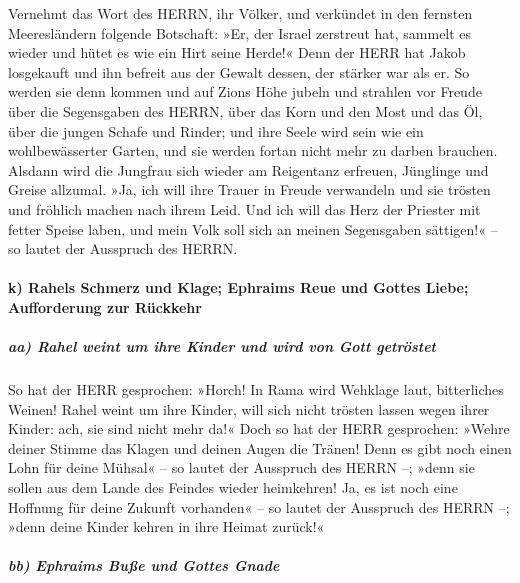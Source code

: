 Vernehmt das Wort des HERRN, ihr Völker, und verkündet in
den fernsten Meeresländern folgende Botschaft: »Er, der Israel zerstreut
hat, sammelt es wieder und hütet es wie ein Hirt seine Herde!«
Denn der HERR hat Jakob losgekauft und ihn befreit aus
der Gewalt dessen, der stärker war als er. So werden sie
denn kommen und auf Zions Höhe jubeln und strahlen vor Freude über die
Segensgaben des HERRN, über das Korn und den Most und das Öl, über die
jungen Schafe und Rinder; und ihre Seele wird sein wie ein
wohlbewässerter Garten, und sie werden fortan nicht mehr zu darben
brauchen. Alsdann wird die Jungfrau sich wieder am
Reigentanz erfreuen, Jünglinge und Greise allzumal. »Ja, ich will ihre
Trauer in Freude verwandeln und sie trösten und fröhlich machen nach
ihrem Leid. Und ich will das Herz der Priester mit fetter
Speise laben, und mein Volk soll sich an meinen Segensgaben sättigen!«
-- so lautet der Ausspruch des HERRN.

\hypertarget{k-rahels-schmerz-und-klage-ephraims-reue-und-gottes-liebe-aufforderung-zur-ruxfcckkehr}{%
\paragraph{k) Rahels Schmerz und Klage; Ephraims Reue und Gottes Liebe;
Aufforderung zur
Rückkehr}\label{k-rahels-schmerz-und-klage-ephraims-reue-und-gottes-liebe-aufforderung-zur-ruxfcckkehr}}

\hypertarget{aa-rahel-weint-um-ihre-kinder-und-wird-von-gott-getruxf6stet}{%
\subparagraph{aa) Rahel weint um ihre Kinder und wird von Gott
getröstet}\label{aa-rahel-weint-um-ihre-kinder-und-wird-von-gott-getruxf6stet}}

So hat der HERR gesprochen: »Horch! In Rama wird Wehklage
laut, bitterliches Weinen! Rahel weint um ihre Kinder, will sich nicht
trösten lassen wegen ihrer Kinder: ach, sie sind nicht mehr da!«
Doch so hat der HERR gesprochen: »Wehre deiner Stimme das
Klagen und deinen Augen die Tränen! Denn es gibt noch einen Lohn für
deine Mühsal« -- so lautet der Ausspruch des HERRN --; »denn sie sollen
aus dem Lande des Feindes wieder heimkehren! Ja, es ist
noch eine Hoffnung für deine Zukunft vorhanden« -- so lautet der
Ausspruch des HERRN --; »denn deine Kinder kehren in ihre Heimat
zurück!«

\hypertarget{bb-ephraims-buuxdfe-und-gottes-gnade}{%
\subparagraph{bb) Ephraims Buße und Gottes
Gnade}\label{bb-ephraims-buuxdfe-und-gottes-gnade}}

